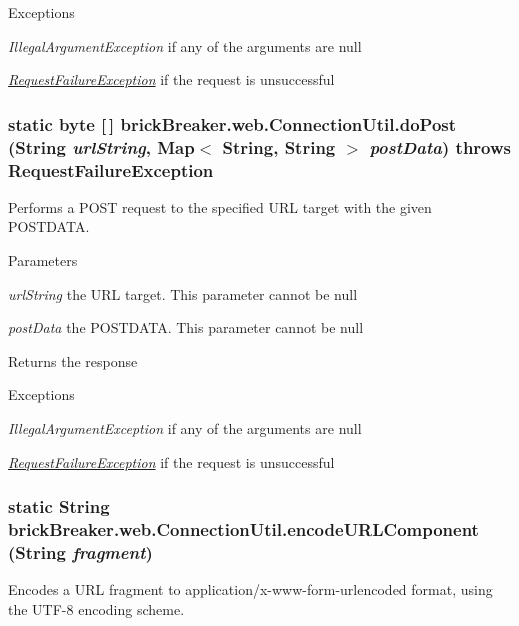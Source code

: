 \begin{DoxyExceptions}{Exceptions}
\item[{\em IllegalArgumentException}]if any of the arguments are {\ttfamily null} \item[{\em \hyperlink{classbrick_breaker_1_1web_1_1_request_failure_exception}{RequestFailureException}}]if the request is unsuccessful \end{DoxyExceptions}
\hypertarget{classbrick_breaker_1_1web_1_1_connection_util_a14b57ed9409efdc30cb80f83202c4dae}{
\subsubsection[{doPost}]{\setlength{\rightskip}{0pt plus 5cm}static byte \mbox{[}$\,$\mbox{]} brickBreaker.web.ConnectionUtil.doPost (String {\em urlString}, \/  Map$<$ String, String $>$ {\em postData})  throws {\bf RequestFailureException} }}
\label{classbrick_breaker_1_1web_1_1_connection_util_a14b57ed9409efdc30cb80f83202c4dae}
Performs a POST request to the specified URL target with the given POSTDATA.


\begin{DoxyParams}{Parameters}
\item[{\em urlString}]the URL target. This parameter cannot be {\ttfamily null} \item[{\em postData}]the POSTDATA. This parameter cannot be {\ttfamily null} \end{DoxyParams}
\begin{DoxyReturn}{Returns}
the response
\end{DoxyReturn}

\begin{DoxyExceptions}{Exceptions}
\item[{\em IllegalArgumentException}]if any of the arguments are {\ttfamily null} \item[{\em \hyperlink{classbrick_breaker_1_1web_1_1_request_failure_exception}{RequestFailureException}}]if the request is unsuccessful \end{DoxyExceptions}
\hypertarget{classbrick_breaker_1_1web_1_1_connection_util_a0b446e1652608c958695ea1e258f2e9b}{
\subsubsection[{encodeURLComponent}]{\setlength{\rightskip}{0pt plus 5cm}static String brickBreaker.web.ConnectionUtil.encodeURLComponent (String {\em fragment})}}
\label{classbrick_breaker_1_1web_1_1_connection_util_a0b446e1652608c958695ea1e258f2e9b}
Encodes a URL fragment to {\ttfamily application/x-\/www-\/form-\/urlencoded} format, using the UTF-\/8 encoding scheme.


